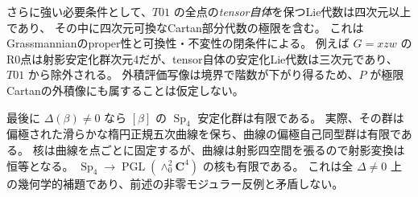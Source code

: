 \documentclass[11pt,a4paper]{ltjsarticle}
\newcommand{\CC}{\mathbf C}
\DeclareMathOperator{\Sp}{Sp}
\theoremstyle{remark}
\begin{document}
さらに強い必要条件として、$T01$ の全点の\emph{tensor自体}を保つLie代数は四次元以上であり、
その中に四次元可換なCartan部分代数の極限を含む。
これはGrassmannianのproper性と可換性・不変性の閉条件による。
例えば $G=xzw$ のR0点は射影安定化群次元4だが、tensor自体の安定化Lie代数は三次元であり、
$T01$ から除外される\cite{strict-stabilizer-v33}。
外積評価写像は境界で階数が下がり得るため、$P$ が極限Cartanの外積像にも属することは仮定しない。

最後に $\Delta(\beta)\ne0$ なら $[\beta]$ の $\Sp_4$ 安定化群は有限である。
実際、その群は偏極された滑らかな楕円正規五次曲線を保ち、曲線の偏極自己同型群は有限である。
核は曲線を点ごとに固定するが、曲線は射影四空間を張るので射影変換は恒等となる。
$\Sp_4\to\operatorname{PGL}(\wedge^2_0\CC^4)$ の核も有限である。
これは全 $\Delta\ne0$ 上の幾何学的補題であり、前述の非零モジュラー反例と矛盾しない。
\end{document}

